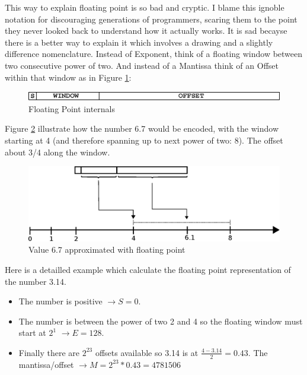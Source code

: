 \documentclass[book.tex]{subfiles}
\begin{document}
\bigskip  
This way to explain floating point is so bad and cryptic. I blame this ignoble notation for discouraging generations of programmers, scaring them to the point they never looked back to understand how it actually works. It is sad becayse there is a better way to explain it which involves a drawing and a slightly difference nomenclature. Instead of Exponent, think of a floating window between two consecutive power of two. And instead of a Mantissa think of an Offset within that window as in Figure \ref{fig:fp_internals}:
  
\begin{figure}[H]
\centering
\includegraphics[scale=0.4]{imgs/floating_point_intuitive.eps}
\caption{Floating Point internals}
\label{fig:fp_internals}
\end{figure}
  \bigskip  

Figure \ref{fig:fp_internals_window} illustrate how the number 6.7 would be encoded, with the window starting at 4 (and therefore spanning up to next power of two: 8). The offset about 3/4 along the window.

\begin{figure}[H]
\centering
\includegraphics[scale=0.7]{imgs/floating_point_window.eps}

\caption{Value 6.7 approximated with floating point}
\label{fig:fp_internals_window}
\end{figure}
  \bigskip
  
Here is a detailled example which calculate the floating point representation of the number 3.14.
\begin{itemize}
 \item The number is positive  $\rightarrow S=0$.
 \item The number is between the power of two 2 and 4 so the floating window must start at $2^1$  $\rightarrow E=128$.
 \item Finally there are $2^{23}$ offsets available so 3.14 is at $\frac{4-3.14}{2} = 0.43 $. The mantissa/offset $\rightarrow M = 2^{23}*0.43 = 4781506$
\end{itemize}
\end{document}
